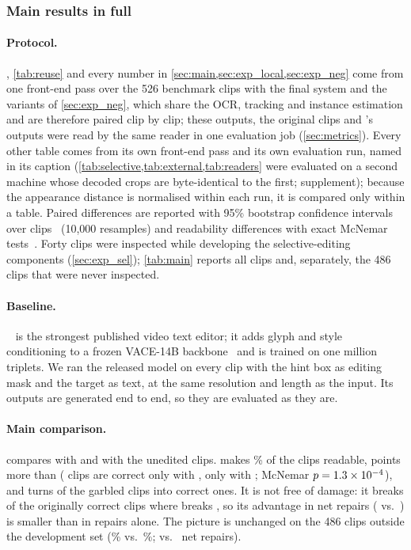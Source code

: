 \subsubsection{Main results in full}
\label{sec:exp_full}

\paragraph{Protocol.} , \cref{tab:reuse} and every number in \cref{sec:main,sec:exp_local,sec:exp_neg} come from one front-end pass over the 526 benchmark clips with the final system and the variants of \cref{sec:exp_neg}, which share the OCR, tracking and instance estimation and are therefore paired clip by clip; these outputs, the original clips and \steer's outputs were read by the same reader in one evaluation job (\cref{sec:metrics}). Every other table comes from its own front-end pass and its own evaluation run, named in its caption (\cref{tab:selective,tab:external,tab:readers} were evaluated on a second machine whose decoded crops are byte-identical to the first; supplement); because the appearance distance is normalised within each run, it is compared only within a table. Paired differences are reported with 95\% bootstrap confidence intervals over clips~\cite{efron1994bootstrap} (10{,}000 resamples) and readability differences with exact McNemar tests~\cite{mcnemar1947}. Forty clips were inspected while developing the selective-editing components (\cref{sec:exp_sel}); \cref{tab:main} reports all clips and, separately, the 486 clips that were never inspected.

\paragraph{Baseline.} \steer~\cite{zeng2026steervte} is the strongest published video text editor; it adds glyph and style conditioning to a frozen VACE-14B backbone~\cite{jiang2025vace} and is trained on one million triplets. We ran the released model on every clip with the hint box as editing mask and the target as text, at the same resolution and length as the input. Its outputs are generated end to end, so they are evaluated as they are.



\paragraph{Main comparison.}
\label{sec:main}
 compares \method with \steer and with the unedited clips. \method makes \rOursRead\% of the clips readable, \rReadGain{} points more than \steer (\rOnlyOurs{} clips are correct only with \method, \rOnlySteer{} only with \steer; McNemar $p=1.3\times10^{-4}$), and turns \rOursFixed{} of the \rGarbled{} garbled clips into correct ones. It is not free of damage: it breaks \rOursBroken{} of the \rOrigCorrect{} originally correct clips where \steer breaks \rSteerBroken, so its advantage in net repairs (\rOursNet{} vs.\ \rSteerNet) is smaller than in repairs alone. The picture is unchanged on the 486 clips outside the development set (\rOursReadND\% vs.\ \rSteerReadND\%; \rOursNetND{} vs.\ \rSteerNetND{} net repairs).

